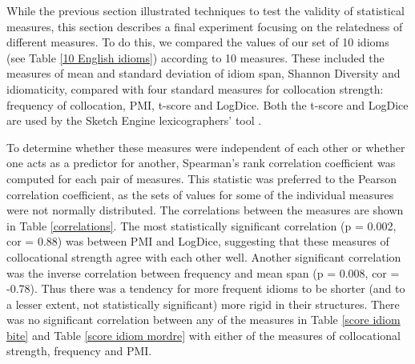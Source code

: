 \documentclass[output=paper]{langsci/langscibook}
\begin{document}
While the previous section illustrated techniques to test the validity
of statistical measures, this section describes a final experiment
focusing on the relatedness of different measures. To do this, we
compared the values of our set of 10 idioms (see Table \ref{10 English idioms}) according to
10 measures. These included the measures of mean and standard deviation
of idiom span, Shannon Diversity and idiomaticity, compared with four
standard measures for collocation strength:  frequency of collocation,
PMI, t-score and LogDice. Both the t-score and LogDice are used by the
Sketch Engine lexicographers’ tool \citep{rychly2008}. 



To determine whether these measures were independent of each other or \linebreak
whether one acts as a predictor for another, Spearman’s rank
correlation coefficient was computed for each pair of measures. This
statistic was preferred to the Pearson correlation coefficient, as the
sets of values for some of the individual measures were not normally
distributed. The correlations between the measures are shown in Table
\ref{correlations}. The most statistically significant correlation (p = 0.002, cor =
0.88) was between PMI and LogDice, suggesting that these measures of
collocational strength agree with each other well. Another significant
correlation was the inverse correlation between frequency and mean span
(p = 0.008, cor = -0.78). Thus there was a tendency for more frequent
idioms to be shorter (and to a lesser extent, not statistically
significant) more rigid in their structures. There was no significant
correlation between any of the measures in Table \ref{score idiom bite} and Table \ref{score idiom mordre} with either
of the measures of collocational strength, frequency and PMI.
\end{document}
